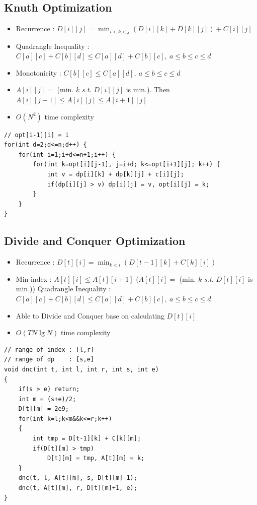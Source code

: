\documentclass[landscape, 8pt, a4paper, oneside, twocolumn]{extarticle}
\begin{document}
\subsection{Knuth Optimization}
\begin{itemize}
\item Recurrence : $ D[i][j] = \min_{i<k<j}(D[i][k] + D[k][j]) + C[i][j]$
\item Quadrangle Inequality : $ C[a][c] + C[b][d] \leq C[a][d] + C[b][c],\ a \leq b \leq c \leq d$
\item Monotonicity : $ C[b][c] \leq C[a][d],\ a \leq b \leq c \leq d$
\item $ A[i][j] = $ (min. $ k $ \textit{s.t.} $ D[i][j] $ is min.). Then $ A[i][j-1] \leq A[i][j] \leq A[i+1][j]$
\item $ O(N^2) $ time complexity
\end{itemize}
\begin{verbatim}
// opt[i-1][i] = i
for(int d=2;d<=n;d++) {
    for(int i=1;i+d<=n+1;i++) {
        for(int k=opt[i][j-1], j=i+d; k<=opt[i+1][j]; k++) {
            int v = dp[i][k] + dp[k][j] + c[i][j];
            if(dp[i][j] > v) dp[i][j] = v, opt[i][j] = k;
        }
    }
}
\end{verbatim}

\subsection{Divide and Conquer Optimization}
\begin{itemize}
\item Recurrence : $ D[t][i] = \min_{k<i} (D[t-1][k] + C[k][i]) $
\item Min index : $ A[t][i] \leq A[t][i+1] $ ($ A[t][i] = $ (min. $ k $ \textit{s.t.} $ D[t][i] $ is min.))
\subitem[-] Quadrangle Inequality : $ C[a][c] + C[b][d] \leq C[a][d] + C[b][c],\ a \leq b \leq c \leq d$
\item Able to Divide and Conquer base on calculating $ D[t][i] $
\item $ O(T N \lg N) $ time complexity
\end{itemize}
\begin{verbatim}
// range of index : [l,r]
// range of dp    : [s,e]
void dnc(int t, int l, int r, int s, int e)
{
    if(s > e) return;
    int m = (s+e)/2;
    D[t][m] = 2e9;
    for(int k=l;k<m&&k<=r;k++)
    {
        int tmp = D[t-1][k] + C[k][m];
        if(D[t][m] > tmp)
            D[t][m] = tmp, A[t][m] = k;
    }
    dnc(t, l, A[t][m], s, D[t][m]-1);
    dnc(t, A[t][m], r, D[t][m]+1, e);
}
\end{verbatim}
\end{document}
